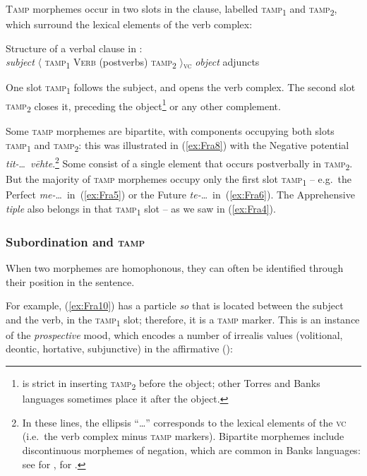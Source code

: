 \documentclass[output=paper,colorlinks,citecolor=brown]{langscibook}
\begin{document}
 
\textsc{Tamp} morphemes occur in two slots in the clause, labelled \textsc{tamp\textsubscript{1}} and \textsc{tamp\textsubscript{2}}, which surround the lexical elements of the verb complex: 
 

\ea \label{ex:Fra9} \textnormal{Structure of a verbal clause in : \\
\textit{subject} $\langle$ \textsc{tamp\textsubscript{1}} \textsc{Verb} (postverbs) \textsc{tamp\textsubscript{2}} $\rangle$\textsubscript{\textsc{vc}} \textit{object} adjuncts}
\z

\noindent One slot \textsc{tamp\textsubscript{1}} follows the subject, and opens the verb complex. The second slot \textsc{tamp\textsubscript{2}} closes it, preceding the object\footnote{ is strict in inserting \textsc{tamp\textsubscript{2}} before the object; other Torres and Banks languages sometimes place it after the object.} or any other complement. 

Some \textsc{tamp} morphemes are bipartite, with components occupying both slots \textsc{tamp\textsubscript{1}} and \textsc{tamp\textsubscript{2}}: this was illustrated in (\ref{ex:Fra8}) with the Negative potential \textit{tit-}\ldots\  \textit{vēhte}.\footnote{In these lines, the ellipsis ``\ldots'' corresponds to the lexical elements of the \textsc{vc} (i.e.\ the verb complex minus \textsc{tamp} markers). Bipartite morphemes include discontinuous morphemes of negation, which are common in Banks languages: see \citet[31]{Schnell2011} for , \citet{Françoisforthcominga} for .} Some consist of a single element that occurs postverbally in \textsc{tamp\textsubscript{2}}. But the majority of \textsc{tamp} morphemes occupy only the first slot \textsc{tamp\textsubscript{1}} -- e.g.\ the Perfect  \textit{me-}\ldots\ in~(\ref{ex:Fra5}) or the Future \textit{te-}\ldots\ in~(\ref{ex:Fra6}). The Apprehensive \textit{tiple} also belongs in that \textsc{tamp\textsubscript{1}} slot -- as we saw in (\ref{ex:Fra4}).

\subsubsection{Subordination and \textsc{tamp}}
\label{subsubsec:subandtamp}

When two morphemes are homophonous, they can often be identified through their position in the sentence. 

For example, (\ref{ex:Fra10}) has a particle \textit{so} that is located between the subject and the verb, in the \textsc{tamp\textsubscript{1}} slot; therefore, it is a \textsc{tamp} marker. This is an instance of the \textit{prospective} mood, which encodes a number of irrealis values (volitional, deontic, hortative, subjunctive) in the affirmative (\citealt[134]{François2005a}):
\end{document}
